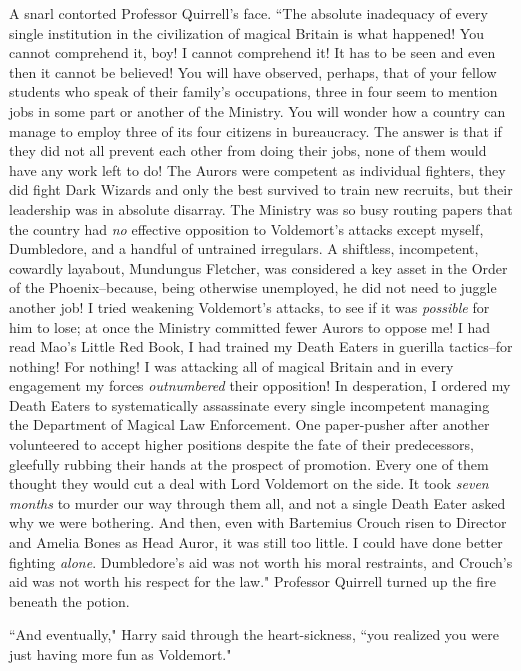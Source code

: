 A snarl contorted Professor Quirrell's face. ``The absolute inadequacy of every single institution in the civilization of magical Britain is what happened! You cannot comprehend it, boy! I cannot comprehend it! It has to be seen and even then it cannot be believed! You will have observed, perhaps, that of your fellow students who speak of their family's occupations, three in four seem to mention jobs in some part or another of the Ministry. You will wonder how a country can manage to employ three of its four citizens in bureaucracy. The answer is that if they did not all prevent each other from doing their jobs, none of them would have any work left to do! The Aurors were competent as individual fighters, they did fight Dark Wizards and only the best survived to train new recruits, but their leadership was in absolute disarray. The Ministry was so busy routing papers that the country had \emph{no} effective opposition to Voldemort's attacks except myself, Dumbledore, and a handful of untrained irregulars. A shiftless, incompetent, cowardly layabout, Mundungus Fletcher, was considered a key asset in the Order of the Phoenix\---because, being otherwise unemployed, he did not need to juggle another job! I tried weakening Voldemort's attacks, to see if it was \emph{possible} for him to lose; at once the Ministry committed fewer Aurors to oppose me! I had read Mao's Little Red Book, I had trained my Death Eaters in guerilla tactics\---for nothing! For nothing! I was attacking all of magical Britain and in every engagement my forces \emph{outnumbered} their opposition! In desperation, I ordered my Death Eaters to systematically assassinate every single incompetent managing the Department of Magical Law Enforcement. One paper-pusher after another volunteered to accept higher positions despite the fate of their predecessors, gleefully rubbing their hands at the prospect of promotion. Every one of them thought they would cut a deal with Lord Voldemort on the side. It took \emph{seven months} to murder our way through them all, and not a single Death Eater asked why we were bothering. And then, even with Bartemius Crouch risen to Director and Amelia Bones as Head Auror, it was still too little. I could have done better fighting \emph{alone}. Dumbledore's aid was not worth his moral restraints, and Crouch's aid was not worth his respect for the law." Professor Quirrell turned up the fire beneath the potion.

``And eventually," Harry said through the heart-sickness, ``you realized you were just having more fun as Voldemort."

